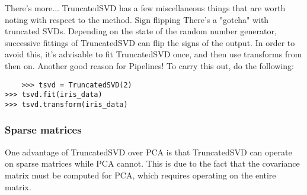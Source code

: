 \documentclass[SKL-MASTER.tex]{subfiles}
\begin{document}
There's more...
TruncatedSVD has a few miscellaneous things that are worth noting with respect to
the method.
Sign flipping
There's a "gotcha" with truncated SVDs. Depending on the state of the random number
generator, successive fittings of TruncatedSVD can flip the signs of the output. In order to
avoid this, it's advisable to fit TruncatedSVD once, and then use transforms from then on.
Another good reason for Pipelines!
To carry this out, do the following:
\begin{framed}
	\begin{verbatim}
	>>> tsvd = TruncatedSVD(2)
>>> tsvd.fit(iris_data)
>>> tsvd.transform(iris_data)
\end{verbatim}
\end{framed}
\subsubsection*{Sparse matrices}
One advantage of TruncatedSVD over PCA is that TruncatedSVD can operate on sparse
matrices while PCA cannot. This is due to the fact that the covariance matrix must be computed
for PCA, which requires operating on the entire matrix.

\newpage
\end{document}
